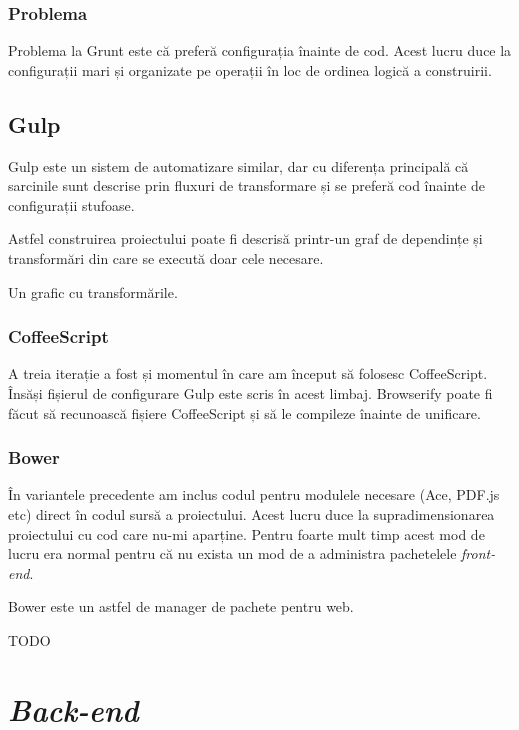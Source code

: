 \documentclass[a4wide,12pt]{report}
\newcommand{\eng}[1]{\emph{#1}} %
\newcommand{\idee}[1]{{\color{red} #1}}
\begin{document}
\subsubsection{Problema}

Problema la Grunt este că preferă configurația înainte de cod. Acest lucru duce
la configurații mari și organizate pe operații în loc de ordinea logică a
construirii.

\subsection{Gulp}

Gulp este un sistem de automatizare similar, dar cu diferența principală că
sarcinile sunt descrise prin fluxuri de transformare și se preferă cod înainte
de configurații stufoase.

Astfel construirea proiectului poate fi descrisă printr-un graf de dependințe și
transformări din care se execută doar cele necesare.

\idee{Un grafic cu transformările.}

\subsubsection{CoffeeScript}

A treia iterație a fost și momentul în care am început să folosesc CoffeeScript.
Însăși fișierul de configurare Gulp este scris în acest limbaj. Browserify poate
fi făcut să recunoască fișiere CoffeeScript și să le compileze înainte de
unificare.

\subsubsection{Bower}

În variantele precedente am inclus codul pentru modulele necesare (Ace, PDF.js
etc) direct în codul sursă a proiectului. Acest lucru duce la supradimensionarea
proiectului cu cod care nu-mi aparține. Pentru foarte mult timp acest mod de
lucru era normal pentru că nu exista un mod de a administra pachetelele
\eng{front-end}.

Bower este un astfel de manager de pachete pentru web.

\idee{TODO}

\section{\eng{Back-end}}
\end{document}

